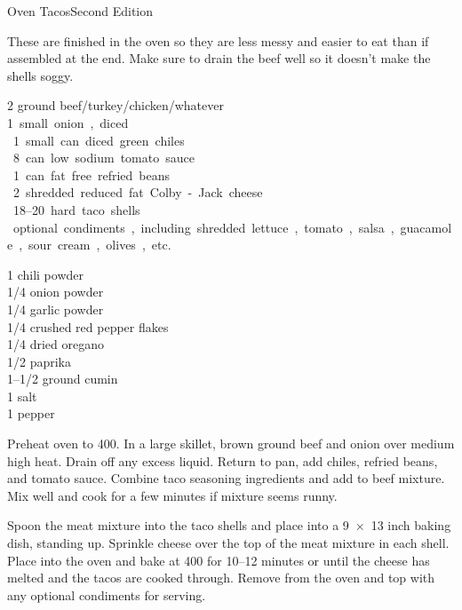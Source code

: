 \begin{entry}{Oven Tacos}{Second Edition}

\begin{open}
These are finished in the oven so they are less messy and easier to eat than if assembled at the end. Make sure to drain the beef well so it doesn't make the shells soggy. 
\end{open}
\begin{ingredients}
  \SI{2}{\pound} ground beef/turkey/chicken/whatever\\
  \SI{1} small onion, diced\\
  \SI{1} small can diced green chiles\\
  \SI{8}{\ounce} can low sodium tomato sauce \\
  \SI{1}{\pound} can fat free refried beans \\
  \SI{2}{\cup} shredded reduced fat Colby-Jack cheese\\
  \numrange{18}{20} hard taco shells\\
  optional condiments, including shredded lettuce, tomato, salsa, guacamole, sour cream, olives, etc.
\end{ingredients}
\begin{ingredients}
  \SI{1}{\tblspoon} chili powder\\
  \SI{1/4}{\teaspoon} onion powder\\
  \SI{1/4}{\teaspoon} garlic powder\\
  \SI{1/4}{\teaspoon} crushed red pepper flakes\\
  \SI{1/4}{\teaspoon} dried oregano\\
  \SI{1/2}{\teaspoon} paprika\\
  \SIrange{1}{1/2}{\teaspoon} ground cumin\\
  \SI{1}{\teaspoon} salt\\
\SI{1}{\teaspoon} pepper\\
\end{ingredients}

Preheat oven to \SI{400}{\degreeF}. In a large skillet, brown ground beef and onion over medium high heat. Drain off any excess liquid. Return to pan, add chiles, refried beans, and tomato sauce. Combine taco seasoning ingredients and add to beef mixture. Mix well and cook for a few minutes if mixture seems runny.

Spoon the meat mixture into the taco shells and place into a \num{9x13} inch baking dish, standing up. Sprinkle cheese over the top of the meat mixture in each shell. Place into the oven and bake at \SI{400}{\degreeF} for \numrange{10}{12} minutes or until the cheese has melted and the tacos are cooked through. Remove from the oven and top with any optional condiments for serving. 

\end{entry}

